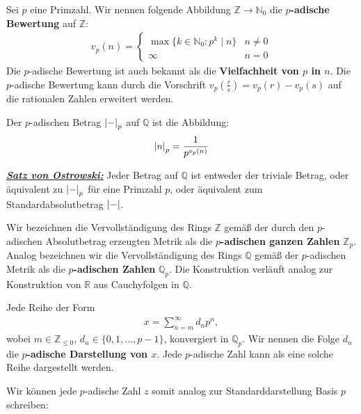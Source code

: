 \documentclass[9pt]{article}
\newcommand{\tbf}[1]{\textbf{#1}}
\newcommand{\ul}[1]{\underline{#1}}
\newcommand{\theoremname}[1]{\emph{\tbf{\ul{#1}}}}
\newcommand{\bN}{\mathbb{N}}
\newcommand{\bQ}{\mathbb{Q}}
\newcommand{\bR}{\mathbb{R}}
\newcommand{\bZ}{\mathbb{Z}}
\begin{document}
	\begin{definition}
		Sei $p$ eine Primzahl. Wir nennen folgende Abbildung $\bZ \to \bN_0$ die \tbf{$p$-adische Bewertung} auf $\bZ$:
		\begin{align*}
			v_p(n) = 
			\begin{cases}
				\max\{k \in \bN_0 : p^k \mid n\} & n \neq 0\\
				\infty & n = 0
			\end{cases}
		\end{align*}
		Die $p$-adische Bewertung ist auch bekannt als die \tbf{Vielfachheit von $p$ in $n$}. Die $p$-adische Bewertung kann durch die Vorschrift $v_p\left(\frac{r}{s}\right) = v_p(r) - v_p(s)$ auf die rationalen Zahlen erweitert werden.
	\end{definition}
	\begin{definition}
		Der $p$-adischen Betrag $\abs{-}_p$ auf $\bQ$ ist die Abbildung:
		\begin{align*} 
			\abs{n}_p = \frac{1}{p^{v_p(n)}}
		\end{align*}
	\end{definition}
	\begin{theorem}
		\theoremname{Satz von Ostrowski:} Jeder Betrag auf $\bQ$ ist entweder der triviale Betrag, oder äquivalent zu $\abs{-}_p$ für eine Primzahl $p$, oder äquivalent zum Standardabsolutbetrag $\abs{-}$.
	\end{theorem}
	\setcounter{hahaone}{2}
	\begin{definition}
		Wir bezeichnen die Vervollständigung des Rings $\bZ$ gemäß der durch den $p$-adischen Absolutbetrag erzeugten Metrik als die \tbf{$p$-adischen ganzen Zahlen} $\bZ_p$. Analog bezeichnen wir die Vervollständigung des Rings $\bQ$ gemäß der $p$-adischen Metrik als die \tbf{$p$-adischen Zahlen} $\bQ_p$. Die Konstruktion verläuft analog zur Konstruktion von $\bR$ aus Cauchyfolgen in $\bQ$.
	\end{definition}
	\begin{proposition}
		Jede Reihe der Form
		\begin{align*}
			x = \sum_{n = m}^\infty d_n p^n,
		\end{align*}
		wobei $m \in \bZ_{\leq 0}$, $d_n \in \{0,1,\hdots,p-1\}$, konvergiert in $\bQ_p$. Wir nennen die Folge $d_n$ die \tbf{$p$-adische Darstellung von $x$}. Jede $p$-adische Zahl kann als eine solche Reihe dargestellt werden.
	\end{proposition}
	\noindent Wir können jede $p$-adische Zahl $z$ somit analog zur Standarddarstellung Basis $p$ schreiben: 
\end{document}
